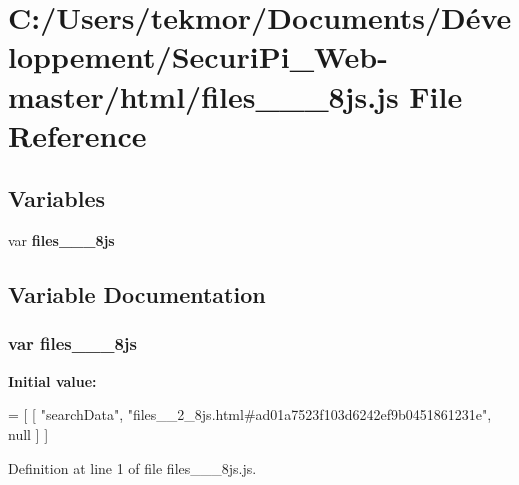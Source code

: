 \section{C\+:/\+Users/tekmor/\+Documents/\+Développement/\+Securi\+Pi\+\_\+\+Web-\/master/html/files\+\_\+\+\_\+\_\+8js.js File Reference}
\label{files____2__8js_8js}
\subsection*{Variables}
\begin{DoxyCompactItemize}
\item 
var {\bf files\+\_\+\+\_\+\_\+8js}
\end{DoxyCompactItemize}


\subsection{Variable Documentation}
\subsubsection[{files\+\_\+\+\_\+2\+\_\+8js}]{\setlength{\rightskip}{0pt plus 5cm}var files\+\_\+\+\_\+\_\+8js}\label{files____2__8js_8js_a34d94c833c1168067280b6374fda2cd8}
{\bfseries Initial value\+:}
\begin{DoxyCode}
=
[
    [ \textcolor{stringliteral}{"searchData"}, \textcolor{stringliteral}{"files\_\_2\_8js.html#ad01a7523f103d6242ef9b0451861231e"}, null ]
]
\end{DoxyCode}


Definition at line 1 of file files\+\_\+\+\_\+\_\+8js.\+js.

